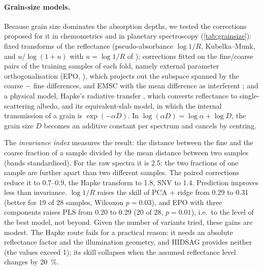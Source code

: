 \documentclass[11pt,a4paper]{article}
\begin{document}
\paragraph{Grain-size models.} Because grain size dominates the absorption depths, we tested the corrections
proposed for it in chemometrics and in planetary spectroscopy (\cref{tab:grainsize}): fixed transforms of the
reflectance (pseudo-absorbance $\log 1/R$, Kubelka--Munk, and $u/\log(1+u)$ with $u = \log 1/R$ of
\citealp{Aucott1988}); corrections fitted on the fine/coarse pairs of the training samples of each fold, namely
external parameter orthogonalisation (EPO, \citealp{Roger2003}), which projects out the subspace spanned by the
coarse $-$ fine differences, and EMSC with the mean difference as interferent \citep{Martens1991}; and a physical
model, Hapke's radiative transfer \citep{Hapke2012}, which converts reflectance to single-scattering albedo, and its
equivalent-slab model, in which the internal transmission of a grain is $\exp(-\alpha D)$. In $\log(\alpha D) =
\log\alpha + \log D$, the grain size $D$ becomes an additive constant per spectrum and cancels by centring.

The \emph{invariance index} measures the result: the distance between the fine and the coarse fraction of a
sample divided by the mean distance between two samples (bands standardised). For the raw spectra it is 2.5: the
two fractions of one sample are further apart than two different samples. The paired corrections reduce it to
0.7--0.9, the Hapke transform to 1.8, SNV to 1.4. Prediction improves less than invariance. $\log 1/R$ raises the
skill of PCA + ridge from 0.29 to 0.31 (better for 19 of 28 samples, Wilcoxon $p = 0.03$), and EPO with three
components raises PLS from 0.20 to 0.29 (20 of 28, $p = 0.01$), i.e.\ to the level of the best model, not beyond.
Given the number of variants tried, these gains are modest. The Hapke route fails for a practical reason: it needs
an absolute reflectance factor and the illumination geometry, and HIDSAG provides neither (the values exceed 1); its
skill collapses when the assumed reflectance level changes by \SI{20}{\percent}.

\begin{table}[t]
  \centering\small
  \caption{Grain-size corrections (LOSO). Invariance: fine--coarse distance of a sample relative to the mean
    distance between samples (0: size leaves no trace). Paired corrections (EPO, EMSC) are fitted in every fold on
    the training samples only. The last two rows vary the assumed absolute reflectance level of the Hapke
    inversion.}
  \label{tab:grainsize}
  \resizebox{\linewidth}{!}{}
\end{table}
\end{document}
